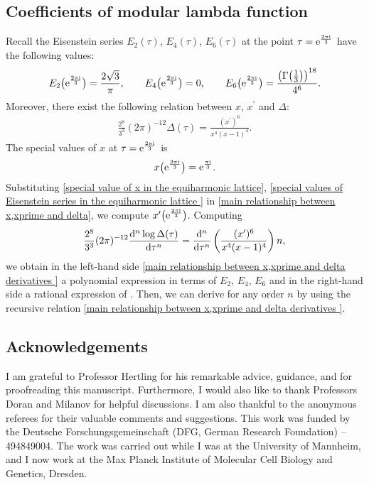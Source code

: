 \documentclass[pdftex]{sigma}
\numberwithin{equation}{section}
\begin{document}
\subsection{Coefficients of modular lambda function}\label{Coefficients of Modular lambda function}

Recall the Eisenstein series $E_2(\tau)$, $E_4(\tau)$, $E_6(\tau)$ at the point $\tau={\rm e}^{\frac{2\pi {\rm i}}{3}}$ have the following values:
\begin{gather}\label{special values of Eisenstein series in the equiharmonic lattice }
E_2\bigl({\rm e}^{\frac{2\pi {\rm i}}{3}}\bigr)=\frac{2\sqrt{3}}{\pi}, \qquad E_4\bigl({\rm e}^{\frac{2\pi {\rm i}}{3}}\bigr)=0, \qquad E_6\bigl({\rm e}^{\frac{2\pi {\rm i}}{3}}\bigr)=\frac{\bigl(\Gamma\bigl(\frac{1}{3}\bigr)\bigr)^{18}}{4^6}.
\end{gather}
Moreover, there exist the following relation between $x$, $x^{\prime}$ and $\Delta$:
\begin{gather}
\frac{2^8}{3^3}(2\pi )^{-12}\Delta(\tau)=\frac{(x^{\prime})^6}{x^4(x-1)^4}.\label{main relationship between x,xprime and delta}
\end{gather}
The special values of $x$ at $\tau={\rm e}^{\frac{2\pi {\rm i}}{3}}$ is
\begin{gather}
x\bigl({\rm e}^{\frac{2\pi {\rm i}}{3}}\bigr)={\rm e}^{\frac{\pi {\rm i}}{3}}.\label{special value of x in the equiharmonic lattice}
\end{gather}
Substituting \eqref{special value of x in the equiharmonic lattice}, \eqref{special values of Eisenstein series in the equiharmonic lattice } in \eqref{main relationship between x,xprime and delta}, we compute $x^{\prime}\bigl({\rm e}^{\frac{2\pi {\rm i}}{3}}\bigr)$. Computing
\begin{gather}
\frac{2^8}{3^3}(2\pi )^{-12}\frac{{\rm d}^n\log\Delta(\tau)}{{\rm d}\tau^n}=\frac{{\rm d}^n}{{\rm d}\tau^n}\left(\frac{(x^{\prime})^6}{x^4(x-1)^4}\right)n,\label{main relationship between x,xprime and delta derivatives }
\end{gather}
we obtain in the left-hand side \eqref{main relationship between x,xprime and delta derivatives } a polynomial expression in terms of $E_2$, $E_4$, $E_6$ and in the right-hand side a rational expression of . Then, we can derive  for any order $n$ by using the recursive relation \eqref{main relationship between x,xprime and delta derivatives }.

\subsection*{Acknowledgements}
I am grateful to Professor Hertling for his remarkable advice, guidance, and for proofreading this manuscript. Furthermore, I would also like to thank Professors Doran and Milanov for helpful discussions. I am also thankful to the anonymous referees for their valuable comments and suggestions. This work was funded by the Deutsche Forschungsgemeinschaft (DFG, German Research Foundation) -- 494849004.
The work was carried out while I was at the University of Mannheim, and I now work at the Max Planck Institute of Molecular Cell Biology and Genetics, Dresden.
\end{document}
